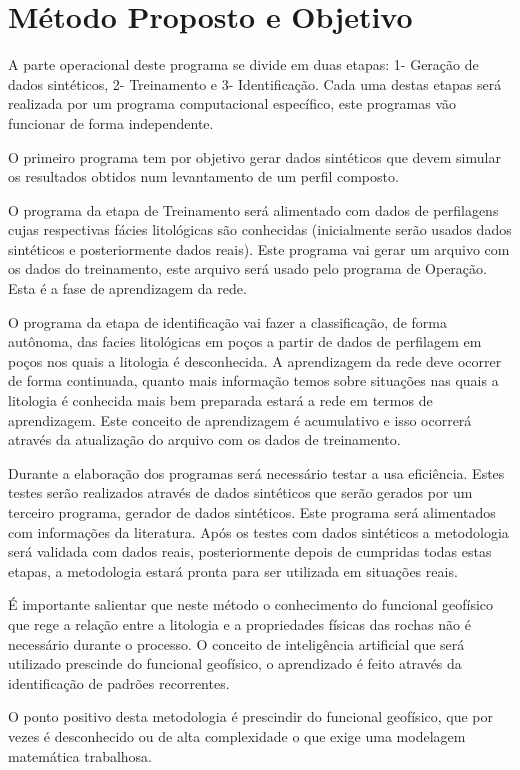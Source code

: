 \chapter{Método Proposto e Objetivo}

A parte operacional deste programa se divide em duas etapas: 1- Geração de dados sintéticos, 2- Treinamento e 3- Identificação. Cada uma destas etapas será realizada por um programa computacional específico, este programas vão funcionar de forma independente.

O primeiro programa tem por objetivo gerar dados sintéticos que devem simular os resultados obtidos num levantamento de um perfil composto.

O programa da etapa de Treinamento será alimentado com dados de perfilagens cujas respectivas fácies litológicas são conhecidas (inicialmente serão usados dados sintéticos e posteriormente dados reais). Este programa vai gerar um arquivo com os dados do treinamento, este arquivo será usado pelo programa de Operação. Esta é a fase de aprendizagem da rede.

O programa da etapa de identificação vai fazer a classificação, de forma autônoma, das facies litológicas em poços a partir de dados de perfilagem em poços nos quais a litologia é desconhecida. A aprendizagem da rede deve ocorrer de forma continuada, quanto mais informação temos sobre situações nas quais a litologia é conhecida mais bem preparada estará a rede em termos de aprendizagem. Este conceito de aprendizagem é acumulativo e isso ocorrerá através da atualização do arquivo com os dados de treinamento.

Durante a elaboração dos programas será necessário testar a usa eficiência. Estes testes serão realizados através de dados sintéticos que serão gerados por um terceiro programa, gerador de dados sintéticos. Este programa será alimentados com informações da literatura. Após os testes com dados sintéticos a metodologia será validada com dados reais, posteriormente depois de cumpridas todas estas etapas, a metodologia estará pronta para ser utilizada em situações reais.

É importante salientar que neste método o conhecimento do funcional geofísico que rege a relação entre a litologia e a propriedades físicas das rochas não é necessário durante o processo. O conceito de inteligência artificial que será utilizado prescinde do funcional geofísico, o aprendizado é feito através da identificação de padrões recorrentes.

O ponto positivo desta metodologia é prescindir do funcional geofísico, que por vezes é desconhecido ou de alta complexidade o que exige uma modelagem matemática trabalhosa.

